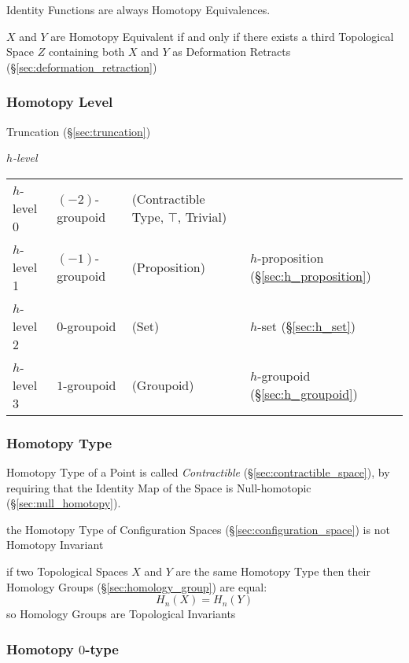 Identity Functions are always Homotopy Equivalences. %

$X$ and $Y$ are Homotopy Equivalent if and only if there exists a
third Topological Space $Z$ containing both $X$ and $Y$ as Deformation
Retracts (\S\ref{sec:deformation_retraction})



\subsubsection{Homotopy Level}\label{sec:homotopy_level}

Truncation (\S\ref{sec:truncation})

\emph{$h$-level}

\begin{tabular}{l l l l}
$h$-level 0   & $(-2)$-groupoid & (Contractible Type, $\top$, Trivial)
  & \\
$h$-level 1   & $(-1)$-groupoid & (Proposition)
  & $h$-proposition (\S\ref{sec:h_proposition}) \\
$h$-level 2   & $0$-groupoid    & (Set)
  & $h$-set (\S\ref{sec:h_set}) \\
$h$-level 3   & $1$-groupoid    & (Groupoid)
  & $h$-groupoid (\S\ref{sec:h_groupoid}) \\
\end{tabular}



\subsubsection{Homotopy Type}\label{sec:homotopy_type}

Homotopy Type of a Point is called \emph{Contractible}
(\S\ref{sec:contractible_space}), by requiring that the Identity Map
of the Space is Null-homotopic (\S\ref{sec:null_homotopy}).

the Homotopy Type of Configuration Spaces (\S\ref{sec:configuration_space}) is
not Homotopy Invariant

if two Topological Spaces $X$ and $Y$ are the same Homotopy Type then their
Homology Groups (\S\ref{sec:homology_group}) are equal:
\[
  H_n(X) = H_n(Y)
\]
so Homology Groups are Topological Invariants



\subsubsection{Homotopy $0$-type}\label{sec:homotopy_0type}

